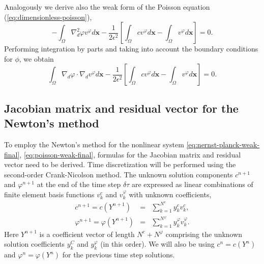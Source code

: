 Analogously we derive also the weak form of the Poisson equation (\ref{eq:dimensionless-poisson}),
\begin{equation}
  -\int_{\Omega}\nabla_d^2\varphi v^\varphi d\mathbf{x}-
  \frac{1}{2\epsilon^2}\left[\int_{\Omega}cv^\varphi d\mathbf{x}-
  \int_{\Omega}v^\varphi d\mathbf{x}\right]=0.
  \label{eq:poisson-weak1}
\end{equation}
Performing integration by parts and taking into account the boundary 
conditions for $\phi$, we obtain
\begin{equation}
  \int_{\Omega}\nabla_d\varphi\cdot\nabla_d v^\varphi d\mathbf{x}-
  \frac{1}{2\epsilon^2}\left[\int_{\Omega}cv^\varphi d\mathbf{x}-
  \int_{\Omega}v^\varphi d\mathbf{x}\right]=0.
  \label{eq:poisson-weak-final}
\end{equation}


\subsection{Jacobian matrix and residual vector for the Newton's method}
To employ the Newton's method for the nonlinear system \eqref{eq:nernst-planck-weak-final},
\eqref{eq:poisson-weak-final}, formulas for the Jacobian matrix and residual vector need to
be derived. Time discretization will be performed using the second-order Crank-Nicolson 
method. The unknown solution components 
$c^{n+1}$ and $\varphi^{n+1}$ at the end of the time step $\delta\tau$ are expressed 
as linear combinations of finite element basis functions $v_k^{c}$ 
and $v_k^{\varphi}$ with unknown coefficients,
\begin{eqnarray}
  c^{n+1} = c(Y^{n+1}) &=& \sum_{k=1}^{N^c} y_k^{c} v_k^{c}, \label{eq:cnotation}\\
  \varphi^{n+1} = \varphi(Y^{n+1}) &=& \sum_{k=1}^{N^{\varphi}} y_k^{\varphi} v_k^{\varphi}\label{eq:phinotation}.
\end{eqnarray}
Here $Y^{n+1}$ is a coefficient vector of length $N^c + N^{\varphi}$ comprising the unknown 
solution coefficients $y_k^{C}$ and $y_k^{\varphi}$ (in this order). We will also be 
using $c^n = c(Y^n)$ and $\varphi^n = \varphi(Y^n)$ for the previous time step solutions.

